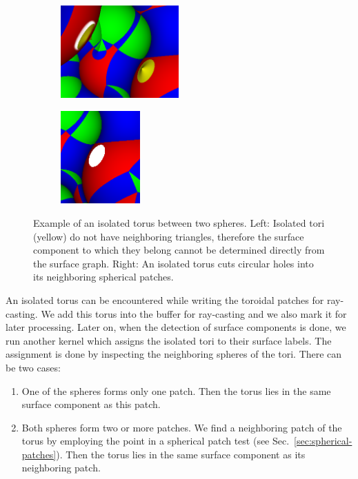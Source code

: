 \begin{figure}[htp]
  \centering
  \begin{subfigure}[t]{0.55\columnwidth}
    \centering
    \includegraphics[height=1.4in]{image/isolated-cutaway2.png}
  \end{subfigure}%
  \quad
  \begin{subfigure}[t]{0.4\columnwidth}
    \centering
    \includegraphics[height=1.4in]{image/isolated-hole.png}
  \end{subfigure}
\caption{Example of an isolated torus between two spheres.
	Left: Isolated tori (yellow) do not have neighboring triangles, therefore the surface component to which they belong cannot be determined directly from the surface graph. Right: An isolated torus cuts circular holes into its neighboring spherical patches.}
\label{fig:isolated-hole}
\end{figure}

An isolated torus can be encountered while writing the toroidal patches for ray-casting.
We add this torus into the buffer for ray-casting and we also mark it for later processing.
Later on, when the detection of surface components is done, we run another kernel which assigns the isolated tori to their surface labels.
The assignment is done by inspecting the neighboring spheres of the tori.
There can be two cases:
\begin{enumerate}
  \item One of the spheres forms only one patch. Then the torus lies in the same surface component as this patch.
	\item Both spheres form two or more patches. We find a neighboring patch of the torus by employing the point in a spherical patch test (see Sec.~\ref{sec:spherical-patches}). Then the torus lies in the same surface component as its neighboring patch.
\end{enumerate}


